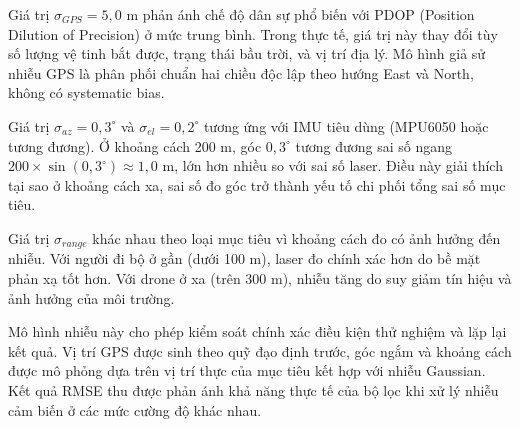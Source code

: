 \begin{table}[H]
\centering
\caption{Tham số mô hình nhiễu cảm biến}
\label{tab:noise-model-detail}
\end{table}

Giá trị $\sigma_{GPS} = 5{,}0$ m phản ánh chế độ dân sự phổ biến với PDOP (Position Dilution of Precision) ở mức trung bình. Trong thực tế, giá trị này thay đổi tùy số lượng vệ tinh bắt được, trạng thái bầu trời, và vị trí địa lý. Mô hình giả sử nhiễu GPS là phân phối chuẩn hai chiều độc lập theo hướng East và North, không có systematic bias.

Giá trị $\sigma_{az} = 0{,}3^\circ{}$ và $\sigma_{el} = 0{,}2^\circ{}$ tương ứng với IMU tiêu dùng (MPU6050 hoặc tương đương). Ở khoảng cách 200 m, góc $0{,}3^\circ{}$ tương đương sai số ngang $200 \times \sin(0{,}3^\circ{}) \approx 1{,}0$ m, lớn hơn nhiều so với sai số laser. Điều này giải thích tại sao ở khoảng cách xa, sai số đo góc trở thành yếu tố chi phối tổng sai số mục tiêu.

Giá trị $\sigma_{range}$ khác nhau theo loại mục tiêu vì khoảng cách đo có ảnh hưởng đến nhiễu. Với người đi bộ ở gần (dưới 100 m), laser đo chính xác hơn do bề mặt phản xạ tốt hơn. Với drone ở xa (trên 300 m), nhiễu tăng do suy giảm tín hiệu và ảnh hưởng của môi trường.

Mô hình nhiễu này cho phép kiểm soát chính xác điều kiện thử nghiệm và lặp lại kết quả. Vị trí GPS được sinh theo quỹ đạo định trước, góc ngắm và khoảng cách được mô phỏng dựa trên vị trí thực của mục tiêu kết hợp với nhiễu Gaussian. Kết quả RMSE thu được phản ánh khả năng thực tế của bộ lọc khi xử lý nhiễu cảm biến ở các mức cường độ khác nhau.


